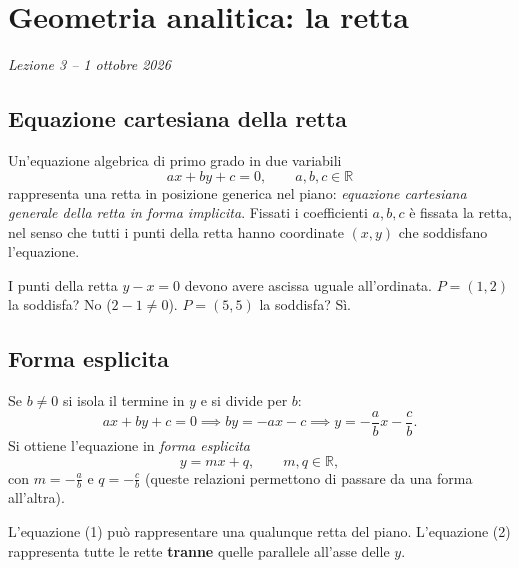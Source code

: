\documentclass[11pt,a4paper]{article}
\begin{document}
\begin{center}
\end{center}

\section[Geometria analitica: la retta (Lezione 3 -- 1 ottobre 2026)]{Geometria analitica: la retta}
\noindent\emph{Lezione 3 -- 1 ottobre 2026}
\subsection{Equazione cartesiana della retta}

Un'equazione algebrica di primo grado in due variabili
\[
ax + by + c = 0, \qquad a, b, c \in \mathbb{R} \tag{1}
\]
rappresenta una retta in posizione generica nel piano: \emph{equazione cartesiana generale della retta in forma implicita}. Fissati i coefficienti $a, b, c$ è fissata la retta, nel senso che tutti i punti della retta hanno coordinate $(x, y)$ che soddisfano l'equazione.

\begin{esempio}
I punti della retta $y - x = 0$ devono avere ascissa uguale all'ordinata. $P = (1, 2)$ la soddisfa? No ($2 - 1 \neq 0$). $P = (5, 5)$ la soddisfa? Sì.
\end{esempio}

\subsection{Forma esplicita}

Se $b \neq 0$ si isola il termine in $y$ e si divide per $b$:
\[
ax + by + c = 0 \implies by = -ax - c \implies y = -\frac{a}{b}x - \frac{c}{b}.
\]
Si ottiene l'equazione in \emph{forma esplicita}
\[
y = mx + q, \qquad m, q \in \mathbb{R}, \tag{2}
\]
con $m = -\frac{a}{b}$ e $q = -\frac{c}{b}$ (queste relazioni permettono di passare da una forma all'altra).

L'equazione (1) può rappresentare una qualunque retta del piano. L'equazione (2) rappresenta tutte le rette \textbf{tranne} quelle parallele all'asse delle $y$.
\end{document}

